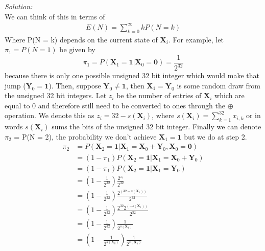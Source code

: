 \documentclass[10pt]{amsart}
\begin{document}
\noindent
\textit{Solution:} \\
We can think of this in terms of 
\begin{align*}
E (N) = \sum_{k=0}^\infty k P(N = k)
\end{align*}
Where P(N = k) depends on the current state of $\bm X_i$.
For example, let $\pi_1 = P(N = 1)$ be given by
$$\pi_1 = P(\bm X_1 = \bm 1| \bm X_0 = \bm 0) = \frac 1 {2^{32}} $$
because there is only one possible unsigned 32 bit integer which would make that jump ($\bm Y_0 = \bm 1$).
Then, suppose $\bm Y_0 \neq \bm 1$, then $\bm X_1 = \bm Y_0$ is some random draw from the unsigned 32 bit integers.
Let $z_i$ be the number of entries of $\bm X_i$ which are equal to 0 and therefore still need to be converted to ones through the $\oplus$ operation.
We denote this as $z_i = 32 - s(\bm X_i)$, where $s(\bm X_i) = \sum_{k=1}^{32} x_{i,k}$ or in words $s(\bm X_i)$ sums the bits of the unsigned 32 bit integer.
Finally we can denote $\pi_2$ = P(N = 2), the probability we don't achieve $\bm X_1 = \bm 1$ but we do at step 2.
\begin{align*}
\pi_2 &= P(\bm X_2 = \bm 1| \bm X_1 = \bm X_0 + \bm Y_0, \bm X_0 = \bm 0) \\
	&= (1 - \pi_1)P(\bm X_2 = \bm 1| \bm X_1 = \bm X_0 + \bm Y_0) \\
	&= (1 - \pi_1)P(\bm X_2 = \bm 1| \bm X_1 = \bm Y_0) \\
	&= \left( 1 - \frac 1 {2^{32}} \right) \frac {2^{z_1}}{2^{32}} \\
	&= \left( 1 - \frac 1 {2^{32}} \right) \frac {2^{\left( 32 - s(\bm X_1)\right)}}{2^{32}} \\
	&= \left( 1 - \frac 1 {2^{32}} \right) \frac {2^{32} 2^{\left(-s(\bm X_1)\right)}}{2^{32}} \\
	&= \left( 1 - \frac 1 {2^{32}} \right) \frac 1 {2^{s(\bm X_1)}} \\
	&= \left( 1 - \frac 1 {2^{s(\bm X_0)}} \right) \frac 1 {2^{s(\bm X_1)}}
\end{align*}
\end{document}
